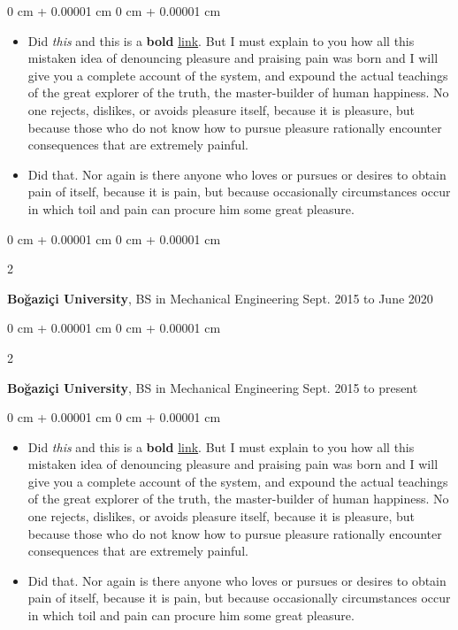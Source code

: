 \documentclass[10pt, letterpaper]{article}
\newenvironment{highlights}{
    \begin{itemize}[
        topsep=0.10 cm,
        parsep=0.10 cm,
        partopsep=0pt,
        itemsep=0pt,
        leftmargin=0 cm + 10pt
    ]
}{
    \end{itemize}
} %
\newenvironment{onecolentry}{
    \begin{adjustwidth}{
        0 cm + 0.00001 cm
    }{
        0 cm + 0.00001 cm
    }
}{
    \end{adjustwidth}
} %
\newenvironment{twocolentry}[2][]{
    \onecolentry
    \def\secondColumn{#2}
    \setcolumnwidth{\fill, 4.5 cm}
    \begin{paracol}{2}
}{
    \switchcolumn \raggedleft \secondColumn
    \end{paracol}
    \endonecolentry
} %
\begin{document}
        \vspace{0.10 cm}
        \begin{onecolentry}
            \begin{highlights}
                \item Did \textit{this} and this is a \textbf{bold} \href{https://example.com}{link}. But I must explain to you how all this mistaken idea of denouncing pleasure and praising pain was born and I will give you a complete account of the system, and expound the actual teachings of the great explorer of the truth, the master-builder of human happiness. No one rejects, dislikes, or avoids pleasure itself, because it is pleasure, but because those who do not know how to pursue pleasure rationally encounter consequences that are extremely painful.
                \item Did that. Nor again is there anyone who loves or pursues or desires to obtain pain of itself, because it is pain, but because occasionally circumstances occur in which toil and pain can procure him some great pleasure.
            \end{highlights}
        \end{onecolentry}


        \vspace{0.2 cm}

        \begin{twocolentry}{
            Sept. 2015 to June 2020
        }
            \textbf{Boğaziçi University}, BS in Mechanical Engineering\end{twocolentry}



        \vspace{0.2 cm}

        \begin{twocolentry}{
            Sept. 2015 to present
        }
            \textbf{Boğaziçi University}, BS in Mechanical Engineering\end{twocolentry}

        \vspace{0.10 cm}
        \begin{onecolentry}
            \begin{highlights}
                \item Did \textit{this} and this is a \textbf{bold} \href{https://example.com}{link}. But I must explain to you how all this mistaken idea of denouncing pleasure and praising pain was born and I will give you a complete account of the system, and expound the actual teachings of the great explorer of the truth, the master-builder of human happiness. No one rejects, dislikes, or avoids pleasure itself, because it is pleasure, but because those who do not know how to pursue pleasure rationally encounter consequences that are extremely painful.
                \item Did that. Nor again is there anyone who loves or pursues or desires to obtain pain of itself, because it is pain, but because occasionally circumstances occur in which toil and pain can procure him some great pleasure.
            \end{highlights}
        \end{onecolentry}
\end{document}
